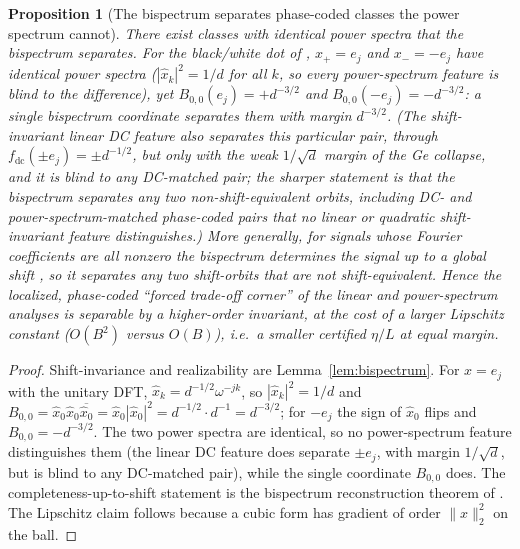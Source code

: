 \documentclass[11pt]{article}
\theoremstyle{plain}
\newtheorem{proposition}{Proposition}
\theoremstyle{definition}
\theoremstyle{remark}
\newcommand{\fdc}{f_{\mathrm{dc}}}
\begin{document}
\begin{proposition}[The bispectrum separates phase-coded classes the power spectrum cannot]\label{prop:bispectrum}
There exist classes with identical power spectra that the bispectrum separates.  For the black/white dot of \citet{Ge2021}, $x_+=e_j$ and $x_-=-e_j$ have identical power spectra ($|\hat x_k|^2=1/d$ for all $k$, so every power-spectrum feature is blind to the difference), yet $B_{0,0}(e_j)=+d^{-3/2}$ and $B_{0,0}(-e_j)=-d^{-3/2}$: a single bispectrum coordinate separates them with margin $d^{-3/2}$.  (The shift-invariant \emph{linear} DC feature also separates this particular pair, through $\fdc(\pm e_j)=\pm d^{-1/2}$, but only with the weak $1/\sqrt d$ margin of the Ge collapse, and it is blind to any DC-matched pair; the sharper statement is that the bispectrum separates any two non-shift-equivalent orbits, including DC- and power-spectrum-matched phase-coded pairs that no linear or quadratic shift-invariant feature distinguishes.)  More generally, for signals whose Fourier coefficients are all nonzero the bispectrum determines the signal up to a global shift \citep{Kakarala2012}, so it separates any two shift-orbits that are not shift-equivalent.  Hence the localized, phase-coded ``forced trade-off corner'' of the linear and power-spectrum analyses is separable by a higher-order invariant, at the cost of a larger Lipschitz constant ($O(B^2)$ versus $O(B)$), i.e.\ a smaller certified $\eta/L$ at equal margin.
\end{proposition}

\begin{proof}
Shift-invariance and realizability are Lemma~\ref{lem:bispectrum}.  For $x=e_j$ with the unitary DFT, $\hat x_k=d^{-1/2}\omega^{-jk}$, so $|\hat x_k|^2=1/d$ and $B_{0,0}=\hat x_0\hat x_0\overline{\hat x_0}=\hat x_0|\hat x_0|^2=d^{-1/2}\cdot d^{-1}=d^{-3/2}$; for $-e_j$ the sign of $\hat x_0$ flips and $B_{0,0}=-d^{-3/2}$.  The two power spectra are identical, so no power-spectrum feature distinguishes them (the linear DC feature does separate $\pm e_j$, with margin $1/\sqrt d$, but is blind to any DC-matched pair), while the single coordinate $B_{0,0}$ does.  The completeness-up-to-shift statement is the bispectrum reconstruction theorem of \citet{Kakarala2012}.  The Lipschitz claim follows because a cubic form has gradient of order $\|x\|_2^2$ on the ball.
\end{proof}
\end{document}
